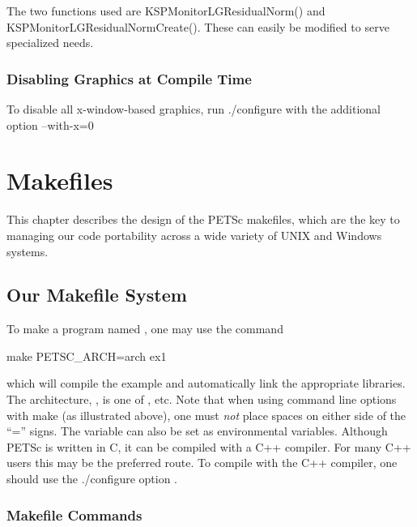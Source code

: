 {{{The two functions used are KSPMonitorLGResidualNorm()
and KSPMonitorLGResidualNormCreate(). These
can easily be modified to serve specialized needs.


\subsection{Disabling Graphics at Compile Time}

To disable all x-window-based graphics, run ./configure with the
additional option --with-x=0


\cleardoublepage
\chapter{Makefiles}
\label{ch_makefiles}

This chapter describes the design of the PETSc makefiles, which are the
key to managing our code portability across a wide variety of UNIX and Windows systems.

\section{Our Makefile System}

To make a program named , one may use the command
\begin{tabbing}
   make PETSC\_ARCH=arch  ex1
\end{tabbing}
which will compile the
example and automatically link the appropriate libraries.  The
architecture, , is one of , etc. Note
that when using command line options with make (as illustrated above),
one must {\em not} place spaces on either side of the ``='' signs.
The variable
 can also be set as environmental
variables.  Although PETSc is written in C, it can be compiled with a
C++ compiler.  For many C++ users this may be the preferred route. To compile
with the C++ compiler, one should use the ./configure option . 

\subsection{Makefile Commands} \label{sec_common}

}}}
